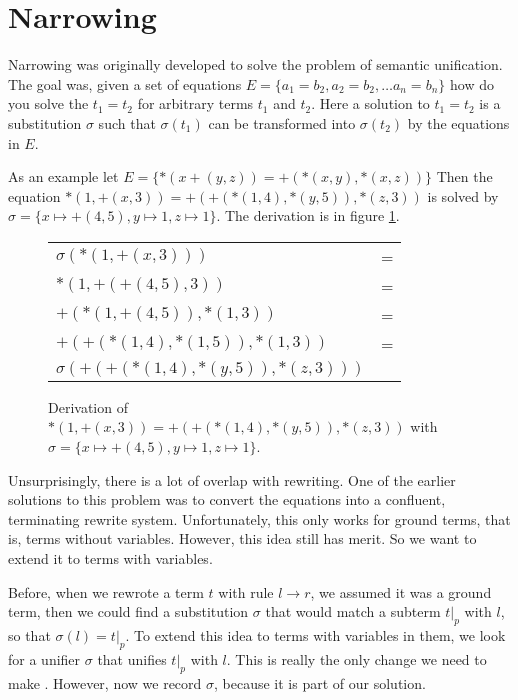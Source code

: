 \documentclass{book}
\theoremstyle{definition}
\begin{document}
\section{Narrowing}

Narrowing was originally developed to solve the problem of semantic unification.
The goal was, given a set of equations $E = \{a_1 = b_2, a_2 = b_2, \ldots a_n = b_n\}$ 
how do you solve the $t_1 = t_2$ for arbitrary terms $t_1$ and $t_2$.
Here a solution to $t_1 = t_2$ is a substitution $\sigma$ such that $\sigma(t_1)$
can be transformed into $\sigma(t_2)$ by the equations in $E$.

As an example let $E = \{*(x +(y, z)) = +(*(x,y), *(x,z))\}$
Then the equation $*(1,+(x,3)) = +(+(*(1,4), *(y,5)), *(z,3))$
is solved by $\sigma = \{x \mapsto +(4,5), y \mapsto 1, z \mapsto 1\}$.
The derivation is in figure \ref{fig:narrow}.

\begin{figure}[h]
\begin{tabular}{ll}
    $\sigma(*(1,+(x,3)))$                & = \\
    $*(1,+(+(4,5),3))$                   & = \\
    $+(*(1,+(4,5)),*(1,3))$              & = \\
    $+(+(*(1,4),*(1,5)),*(1,3))$         & = \\
    $\sigma(+(+(*(1,4),*(y,5)),*(z,3)))$ &
\end{tabular}
    \caption{Derivation of $*(1,+(x,3)) = +(+(*(1,4), *(y,5)), *(z,3))$ with
             $\sigma = \{x \mapsto +(4,5), y \mapsto 1, z \mapsto 1\}$.}
    \label{fig:narrow}
\end{figure}

Unsurprisingly, there is a lot of overlap with rewriting.
One of the earlier solutions to this problem was to convert 
the equations into a confluent, terminating rewrite system. \cite{KnuthBendix}
Unfortunately, this only works for ground terms, that is, terms without variables.
However, this idea still has merit.
So we want to extend it to terms with variables.

Before, when we rewrote a term $t$ with rule $l \to r$, we assumed it was a ground term,
then we could find a substitution $\sigma$ that would match a subterm $t\vert_p$ with $l$,
so that $\sigma(l) = t\vert_p$.
To extend this idea to terms with variables in them, 
we look for a unifier $\sigma$ that unifies $t\vert_p$ with $l$.
This is really the only change we need to make \cite{AdvancedTRS}.
However, now we record $\sigma$, because it is part of our solution.
\end{document}
